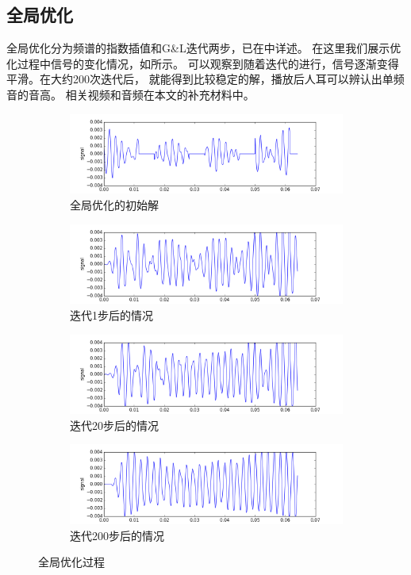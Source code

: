 \subsection{全局优化}
全局优化分为频谱的指数插值和G\&L迭代两步，已在中详述。
在这里我们展示优化过程中信号的变化情况，如所示。
可以观察到随着迭代的进行，信号逐渐变得平滑。在大约200次迭代后，
就能得到比较稳定的解，播放后人耳可以辨认出单频音的音高。
相关视频和音频在本文的补充材料中。
\begin{figure}[h!]\begin{center}
    \begin{subfigure}[b]{\figwidth}
        \includegraphics[width=\figwidth]{res/opt00.png}
        \caption{全局优化的初始解}
    \end{subfigure}
    \begin{subfigure}[b]{\figwidth}
        \includegraphics[width=\figwidth]{res/opt01.png}
        \caption{迭代1步后的情况}
    \end{subfigure}
    \begin{subfigure}[b]{\figwidth}
        \includegraphics[width=\figwidth]{res/opt20.png}
        \caption{迭代20步后的情况}
    \end{subfigure}
    \begin{subfigure}[b]{\figwidth}
        \includegraphics[width=\figwidth]{res/opt200.png}
        \caption{迭代200步后的情况}
    \end{subfigure}
    \caption{全局优化过程}
    \label{fig:global-opt}
\end{center}\end{figure}

